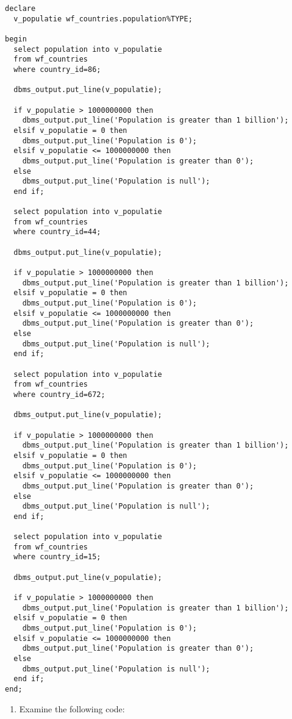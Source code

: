 \documentclass[11pt]{article}
\begin{document}
\begin{verbatim}
declare
  v_populatie wf_countries.population%TYPE;

begin
  select population into v_populatie
  from wf_countries
  where country_id=86;
  
  dbms_output.put_line(v_populatie);

  if v_populatie > 1000000000 then
    dbms_output.put_line('Population is greater than 1 billion');
  elsif v_populatie = 0 then
    dbms_output.put_line('Population is 0');
  elsif v_populatie <= 1000000000 then
    dbms_output.put_line('Population is greater than 0');
  else
    dbms_output.put_line('Population is null');
  end if;

  select population into v_populatie
  from wf_countries
  where country_id=44;

  dbms_output.put_line(v_populatie);

  if v_populatie > 1000000000 then
    dbms_output.put_line('Population is greater than 1 billion');
  elsif v_populatie = 0 then
    dbms_output.put_line('Population is 0');
  elsif v_populatie <= 1000000000 then
    dbms_output.put_line('Population is greater than 0');
  else
    dbms_output.put_line('Population is null');
  end if;

  select population into v_populatie
  from wf_countries
  where country_id=672;

  dbms_output.put_line(v_populatie);

  if v_populatie > 1000000000 then
    dbms_output.put_line('Population is greater than 1 billion');
  elsif v_populatie = 0 then
    dbms_output.put_line('Population is 0');
  elsif v_populatie <= 1000000000 then
    dbms_output.put_line('Population is greater than 0');
  else
    dbms_output.put_line('Population is null');
  end if;

  select population into v_populatie
  from wf_countries
  where country_id=15;

  dbms_output.put_line(v_populatie);

  if v_populatie > 1000000000 then
    dbms_output.put_line('Population is greater than 1 billion');
  elsif v_populatie = 0 then
    dbms_output.put_line('Population is 0');
  elsif v_populatie <= 1000000000 then
    dbms_output.put_line('Population is greater than 0');
  else
    dbms_output.put_line('Population is null');
  end if;
end;
\end{verbatim}


\begin{enumerate}
\item Examine the following code:
\end{enumerate}
\end{document}
